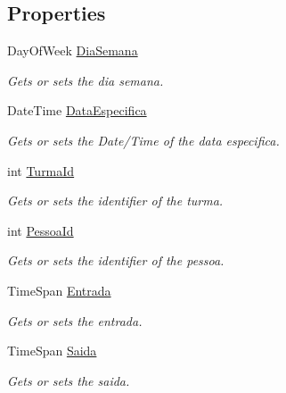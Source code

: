 \subsection*{Properties}
\begin{DoxyCompactItemize}
\item 
Day\+Of\+Week \hyperlink{class_cruzeiro_1_1_core_1_1_model_1_1_beans_1_1_regra_bean_a40097ba76b08827fb1c7b32e83aec773}{Dia\+Semana}
\begin{DoxyCompactList}\small\item\em Gets or sets the dia semana. \end{DoxyCompactList}\item 
Date\+Time \hyperlink{class_cruzeiro_1_1_core_1_1_model_1_1_beans_1_1_regra_bean_a592374d2ee412eae712ae03477d9f38b}{Data\+Especifica}
\begin{DoxyCompactList}\small\item\em Gets or sets the Date/\+Time of the data especifica. \end{DoxyCompactList}\item 
int \hyperlink{class_cruzeiro_1_1_core_1_1_model_1_1_beans_1_1_regra_bean_a63c53c78ae9a36c2ed677d4f71206c8b}{Turma\+Id}
\begin{DoxyCompactList}\small\item\em Gets or sets the identifier of the turma. \end{DoxyCompactList}\item 
int \hyperlink{class_cruzeiro_1_1_core_1_1_model_1_1_beans_1_1_regra_bean_a99844cc22f9fbed95ea385b8af05f371}{Pessoa\+Id}
\begin{DoxyCompactList}\small\item\em Gets or sets the identifier of the pessoa. \end{DoxyCompactList}\item 
Time\+Span \hyperlink{class_cruzeiro_1_1_core_1_1_model_1_1_beans_1_1_regra_bean_a68bfef053cf6dd86ad96ea1196033de8}{Entrada}
\begin{DoxyCompactList}\small\item\em Gets or sets the entrada. \end{DoxyCompactList}\item 
Time\+Span \hyperlink{class_cruzeiro_1_1_core_1_1_model_1_1_beans_1_1_regra_bean_accb745dad1eb5ea8cff30ad84bf2e841}{Saida}
\begin{DoxyCompactList}\small\item\em Gets or sets the saida. \end{DoxyCompactList}\end{DoxyCompactItemize}
